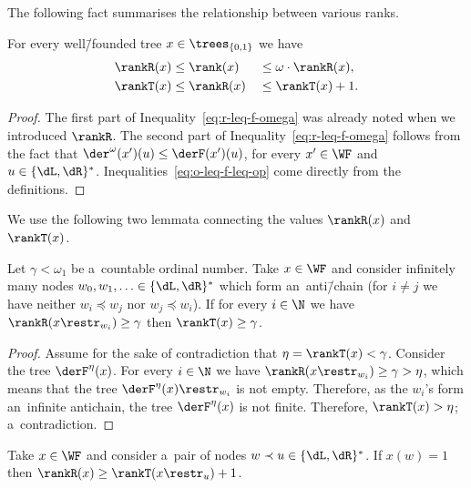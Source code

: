 The following fact summarises the relationship between various ranks.

\begin{fact}\label{ft:monotone}
	For every well\=/founded tree $x\in\trees_{\{0,1\}}$ we have
	\begin{alignat}{4}
	\rankR(x) &\leq \rank(x) &&\leq\omega\cdot \rankR(x),\label{eq:r-leq-f-omega}\\
	\rankT(x) &\leq \rankR(x) &&\leq\rankT(x)+1.\label{eq:o-leq-f-leq-op}
	\end{alignat}
\end{fact}

\begin{proof}
	The first part of Inequality~\eqref{eq:r-leq-f-omega} was already noted when we introduced $\rankR$.
	The second part of Inequality~\eqref{eq:r-leq-f-omega} follows from the fact that $\der^\omega(x')(u) \leq \derF(x')(u)$, for every $x'\in\WF$ and $u\in\{\dL,\dR\}^\ast$.
	Inequalities~\eqref{eq:o-leq-f-leq-op} come directly from the definitions.
\end{proof}

We use the following two lemmata connecting the values $\rankR(x)$ and $\rankT(x)$.

\begin{lem}\label{lem:inf-fank-to-oank}
	Let $\gamma<\omega_1$ be a~countable ordinal number.
	Take $x\in\WF$ and consider infinitely many nodes $w_0,w_1,\ldots\in\{\dL,\dR\}^\ast$ which form an~anti\=/chain (for $i\neq j$ we have neither $w_i\preceq w_j$ nor $w_j\preceq w_i$).
	If for every $i\in\N$ we have $\rankR(x\restr_{w_i})\geq \gamma$ then $\rankT(x)\geq\gamma$.
\end{lem}

\begin{proof}
	Assume for the sake of contradiction that $\eta=\rankT(x)<\gamma$.
	Consider the tree $\derF^\eta(x)$.
	For every $i\in\N$ we have $\rankR(x\restr_{w_i})\geq\gamma>\eta$, which means that the tree $\derF^\eta(x)\restr_{w_i}$ is not empty.
	Therefore, as the $w_i$'s form an~infinite antichain, the tree $\derF^\eta(x)$ is not finite.
	Therefore, $\rankT(x)>\eta$; a~contradiction.
\end{proof}

\begin{lem}\label{lem:fin-oank-to-fank}
	Take $x\in\WF$ and consider a~pair of nodes $w\prec u\in\{\dL,\dR\}^\ast$.
	If $x(w)=1$ then $\rankR(x)\geq \rankT(x\restr_u)+1$.
\end{lem}

